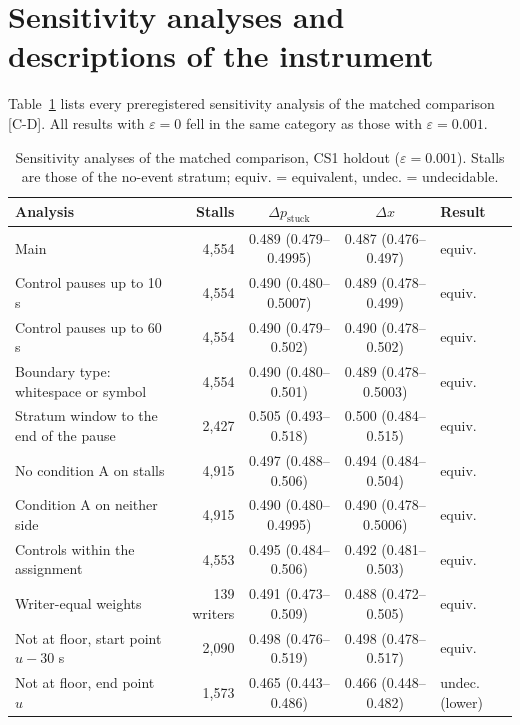 \section{Sensitivity analyses and descriptions of the instrument}
\label{app:sensitivity}

Table~\ref{tab:sens} lists every preregistered sensitivity analysis of the matched comparison [C-D]. All results with
$\varepsilon = 0$ fell in the same category as those with $\varepsilon = 0.001$.

\begin{table}
  \caption{Sensitivity analyses of the matched comparison, CS1 holdout ($\varepsilon = 0.001$). Stalls are those of
  the no-event stratum; equiv. = equivalent, undec. = undecidable.}
  \label{tab:sens}
  \centering\footnotesize
  \setlength{\tabcolsep}{3pt}
  \begin{tabularx}{\linewidth}{>{\raggedright\arraybackslash}X r c c l}
    \toprule
    Analysis & Stalls & $\Delta p_{\mathrm{stuck}}$ & $\Delta x$ & Result \\
    \midrule
    Main & 4,554 & 0.489 (0.479--0.4995) & 0.487 (0.476--0.497) & equiv. \\
    Control pauses up to 10 s & 4,554 & 0.490 (0.480--0.5007) & 0.489 (0.478--0.499) & equiv. \\
    Control pauses up to 60 s & 4,554 & 0.490 (0.479--0.502) & 0.490 (0.478--0.502) & equiv. \\
    Boundary type: whitespace or symbol & 4,554 & 0.490 (0.480--0.501) & 0.489 (0.478--0.5003) & equiv. \\
    Stratum window to the end of the pause & 2,427 & 0.505 (0.493--0.518) & 0.500 (0.484--0.515) & equiv. \\
    No condition A on stalls & 4,915 & 0.497 (0.488--0.506) & 0.494 (0.484--0.504) & equiv. \\
    Condition A on neither side & 4,915 & 0.490 (0.480--0.4995) & 0.490 (0.478--0.5006) & equiv. \\
    Controls within the assignment & 4,553 & 0.495 (0.484--0.506) & 0.492 (0.481--0.503) & equiv. \\
    Writer-equal weights & 139 writers & 0.491 (0.473--0.509) & 0.488 (0.472--0.505) & equiv. \\
    Not at floor, start point $u - 30$ s & 2,090 & 0.498 (0.476--0.519) & 0.498 (0.478--0.517) & equiv. \\
    Not at floor, end point $u$ & 1,573 & 0.465 (0.443--0.486) & 0.466 (0.448--0.482) & undec. (lower) \\

\end{tabularx}
\end{table}
